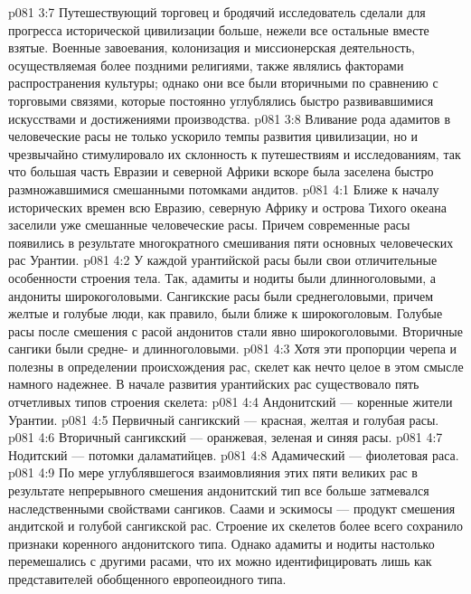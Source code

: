 \vs p081 3:7 Путешествующий торговец и бродячий исследователь сделали для прогресса исторической цивилизации больше, нежели все остальные вместе взятые. Военные завоевания, колонизация и миссионерская деятельность, осуществляемая более поздними религиями, также являлись факторами распространения культуры; однако они все были вторичными по сравнению с торговыми связями, которые постоянно углублялись быстро развивавшимися искусствами и достижениями производства.
\vs p081 3:8 Вливание рода адамитов в человеческие расы не только ускорило темпы развития цивилизации, но и чрезвычайно стимулировало их склонность к путешествиям и исследованиям, так что большая часть Евразии и северной Африки вскоре была заселена быстро размножавшимися смешанными потомками андитов.
\vs p081 4:1 Ближе к началу исторических времен всю Евразию, северную Африку и острова Тихого океана заселили уже смешанные человеческие расы. Причем современные расы появились в результате многократного смешивания пяти основных человеческих рас Урантии.
\vs p081 4:2 У каждой урантийской расы были свои отличительные особенности строения тела. Так, адамиты и нодиты были длинноголовыми, а андониты широкоголовыми. Сангикские расы были среднеголовыми, причем желтые и голубые люди, как правило, были ближе к широкоголовым. Голубые расы после смешения с расой андонитов стали явно широкоголовыми. Вторичные сангики были средне\hyp{} и длинноголовыми.
\vs p081 4:3 Хотя эти пропорции черепа и полезны в определении происхождения рас, скелет как нечто целое в этом смысле намного надежнее. В начале развития урантийских рас существовало пять отчетливых типов строения скелета:
\vs p081 4:4 \bibnobreakspace Андонитский --- коренные жители Урантии.
\vs p081 4:5 \bibnobreakspace Первичный сангикский --- красная, желтая и голубая расы.
\vs p081 4:6 \bibnobreakspace Вторичный сангикский --- оранжевая, зеленая и синяя расы.
\vs p081 4:7 \bibnobreakspace Нодитский --- потомки даламатийцев.
\vs p081 4:8 \bibnobreakspace Адамический --- фиолетовая раса.
\vs p081 4:9 \pc По мере углублявшегося взаимовлияния этих пяти великих рас в результате непрерывного смешения андонитский тип все больше затмевался наследственными свойствами сангиков. Саами и эскимосы --- продукт смешения андитской и голубой сангикской рас. Строение их скелетов более всего сохранило признаки коренного андонитского типа. Однако адамиты и нодиты настолько перемешались с другими расами, что их можно идентифицировать лишь как представителей обобщенного европеоидного типа.
